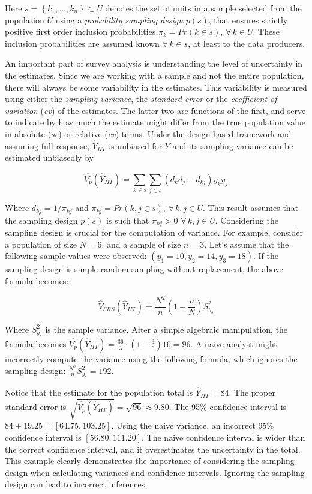 \documentclass[
  12pt,
]{book}
\begin{document}
Here \(s = \left\{ k_1, \ldots, k_n \right\} \subset U\) denotes the set of units in a sample selected from the population \(U\) using a \emph{probability sampling design} \(p(s)\), that ensures strictly positive first order inclusion probabilities \(\pi_k = Pr(k \in s), \, \forall \, k \in U\). These inclusion probabilities are assumed known \(\forall \, k \in s\), at least to the data producers.

An important part of survey analysis is understanding the level of uncertainty in the estimates. Since we are working with a sample and not the entire population, there will always be some variability in the estimates. This variability is measured using either the \emph{sampling variance}, the \emph{standard error} or the \emph{coefficient of variation} (\emph{cv}) of the estimates. The latter two are functions of the first, and serve to indicate by how much the estimate might differ from the true population value in absolute (\emph{se}) or relative (\emph{cv}) terms. Under the design-based framework and assuming full response, \(\widehat Y _{HT}\) is unbiased for \(Y\) and its sampling variance can be estimated unbiasedly by

\[
\widehat {V_p} \left( \widehat{Y}_{HT} \right) = \sum_{k \in s} \sum_{j \in s} \left( d_k d_j - d_{kj} \right) y_k y_j
\]

Where \(d_{kj} = 1 / \pi_{kj}\) and \(\pi_{kj} = Pr(k,j \in s), \, \forall \, k,j \in U\). This result assumes that the sampling design \(p(s)\) is such that \(\pi_{kj} > 0 \,\, \forall \, k,j \in U\). Considering the sampling design is crucial for the computation of variance. For example, consider a population of size \(N = 6\), and a sample of size \(n = 3\). Let's assume that the following sample values were observed: \((y_1 = 10, y_2 = 14, y_3 = 18)\). If the sampling design is simple random sampling without replacement, the above formula becomes:

\[
\widehat {V}_{SRS} \left( \widehat{Y}_{HT} \right) = \frac{N^2}{n} \left( 1 - \frac{n}{N} \right) S^2_{y_s}
\]

Where \(S^2_{y_s}\) is the sample variance. After a simple algebraic manipulation, the formula becomes \(\widehat {V_p} \left( \widehat{Y}_{HT} \right) = \frac{36}{3} \cdot \left(1 - \frac{3}{6} \right) 16 = 96\). A naive analyst might incorrectly compute the variance using the following formula, which ignores the sampling design: \(\frac{N^2}{n}S^2_{y_s} = 192\).

Notice that the estimate for the population total is \(\widehat{Y}_{HT} = 84\). The proper standard error is \(\sqrt{\widehat {V_p} \left( \widehat{Y}_{HT} \right)} = \sqrt{96} \approx 9.80\). The 95\% confidence interval is \(84 \pm 19.25 = [64.75, 103.25]\). Using the naive variance, an incorrect 95\% confidence interval is \([56.80, 111.20]\). The naive confidence interval is wider than the correct confidence interval, and it overestimates the uncertainty in the total. This example clearly demonstrates the importance of considering the sampling design when calculating variances and confidence intervals. Ignoring the sampling design can lead to incorrect inferences.
\end{document}
